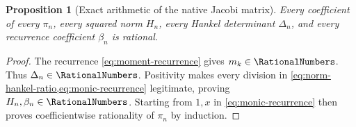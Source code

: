 \documentclass[11pt,oneside]{article}
\newtheorem{proposition}[theorem]{Proposition}
\theoremstyle{definition}
\theoremstyle{remark}
\numberwithin{equation}{section}
\begin{document}
\begin{proposition}[Exact arithmetic of the native Jacobi matrix]
\label{prop:rational-jacobi}
Every coefficient of every $\pi_n$, every squared norm $H_n$, every Hankel
determinant $\Delta_n$, and every recurrence coefficient $\beta_n$ is
rational.
\end{proposition}

\begin{proof}
The recurrence \cref{eq:moment-recurrence} gives $m_k\in\RationalNumbers$.  Thus
$\Delta_n\in\RationalNumbers$.  Positivity makes every division in
\cref{eq:norm-hankel-ratio,eq:monic-recurrence} legitimate, proving
$H_n,\beta_n\in\RationalNumbers$.  Starting from $1,x$ in
\cref{eq:monic-recurrence} then proves coefficientwise rationality of
$\pi_n$ by induction.
\end{proof}
\end{document}
